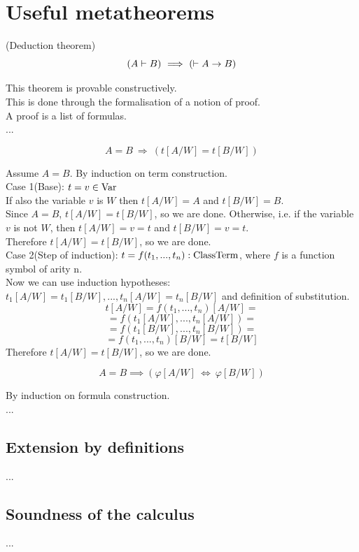 \section{Useful metatheorems}

\begin{theorem}(Deduction theorem)
\[
(A \vdash B)
\ \Longrightarrow\ 
(\vdash A\to B)
\]
\end{theorem}
\Proof
This theorem is provable constructively.\\
This is done through the formalisation of a notion of proof.\\
A proof is a list of formulas.\\
...\\
\Done
\begin{theorem}
\[
A=B\ \Longrightarrow\ (t[A/W]=t[B/W])
\]
\end{theorem}
\Proof
Assume $A=B$.
By induction on term construction.\\
Case 1(Base): $t=v\in \mathrm{Var}$\\
If also the variable $v$ is $W$ then $t[A/W]=A$ and $t[B/W]=B$.\\
Since $A=B$, $t[A/W]=t[B/W]$, so we are done.
Otherwise, i.e. if the variable $v$ is not $W$, then $t[A/W]=v=t$ and $t[B/W]=v=t$.\\
Therefore $t[A/W]=t[B/W]$, so we are done.\\
Case 2(Step of induction): $t=f(t_1,...,t_n): {\text{ClassTerm}}$, where $f$ is a function symbol of arity n.\\
Now we can use induction hypotheses: $t_1[A/W]=t_1[B/W],...,t_n[A/W]=t_n[B/W]$ and definition of substitution.
\[
t[A/W]=f(t_1,...,t_n)[A/W]=
\]
\[
=f(t_1[A/W],...,t_n[A/W])=
\]
\[
=f(t_1[B/W],...,t_n[B/W])=
\]
\[
=f(t_1,...,t_n)[B/W]=t[B/W]
\]
Therefore $t[A/W]=t[B/W]$, so we are done.\\
\Done

\begin{theorem}
\[
A=B
\implies
(\varphi[A/W]\ \Longleftrightarrow\ \varphi[B/W])
\]
\end{theorem}
\Proof
By induction on formula construction.\\
...\\
\Done

\subsection{Extension by definitions}
...

\subsection{Soundness of the calculus}
...
\pagebreak
